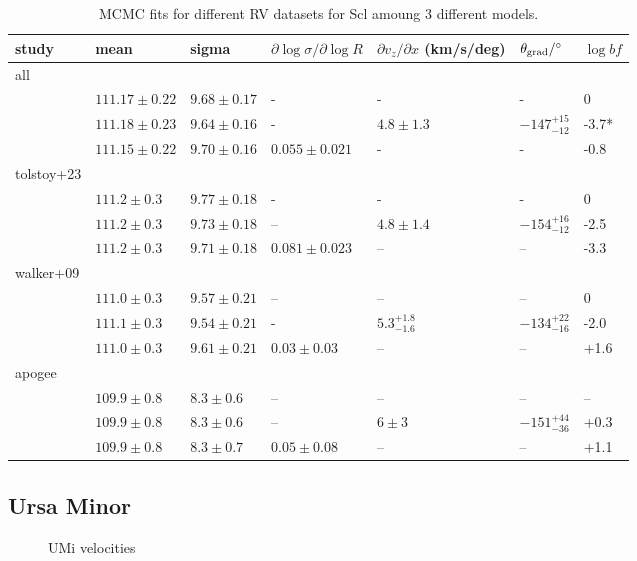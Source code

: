 \begin{table*}[t]
\centering
\caption{MCMC fits for different RV datasets for Scl amoung 3 different models.}
\label{tbl:MCMC-fits-for-different-RV-datasets-for-Scl-amoung-3-different-models}
\begin{tabular}{lllllll}
\toprule
study & mean & sigma & $\partial \log\sigma / \partial \log R$ & $\partial v_z / \partial x$ (km/s/deg) & $\theta_{\rm grad} / ^{\circ}$ & $\log bf$\\
\midrule
all &  &  &  &  &  & \\
 & $111.17\pm0.22$ & $9.68\pm0.17$ & - & - & - & 0\\
 & $111.18 \pm 0.23$ & $9.64\pm0.16$ & - & $4.8\pm1.3$ & $-147_{-12}^{+15}$ & -3.7*\\
 & $111.15\pm0.22$ & $9.70\pm0.16$ & $0.055\pm0.021$ & - & - & -0.8\\
tolstoy+23 &  &  &  &  &  & \\
 & $111.2 \pm 0.3$ & $9.77 \pm 0.18$ & - & - & - & 0\\
 & $111.2\pm0.3$ & $9.73\pm0.18$ & – & $4.8\pm1.4$ & $-154_{-12}^{+16}$ & -2.5\\
 & $111.2 \pm 0.3$ & $9.71\pm0.18$ & $0.081 \pm 0.023$ & – & – & -3.3\\
walker+09 &  &  &  &  &  & \\
 & $111.0\pm0.3$ & $9.57\pm0.21$ & – & – & – & 0\\
 & $111.1\pm0.3$ & $9.54\pm0.21$ & - & $5.3_{-1.6}^{+1.8}$ & $-134_{-16}^{+22}$ & -2.0\\
 & $111.0\pm0.3$ & $9.61\pm0.21$ & $0.03\pm0.03$ & – & – & +1.6\\
apogee &  &  &  &  &  & \\
 & $109.9\pm0.8$ & $8.3\pm0.6$ & – & – & – & –\\
 & $109.9\pm0.8$ & $8.3\pm0.6$ & – & $6\pm3$ & $-151_{-36}^{+44}$ & +0.3\\
 & $109.9\pm0.8$ & $8.3\pm0.7$ & $0.05\pm0.08$ & – & – & +1.1\\
\bottomrule
\end{tabular}
\end{table*}

\subsection{Ursa Minor}\label{ursa-minor}

\begin{figure}
\centering
{}
\caption[UMi velocity sample]{UMi velocities}
\end{figure}

